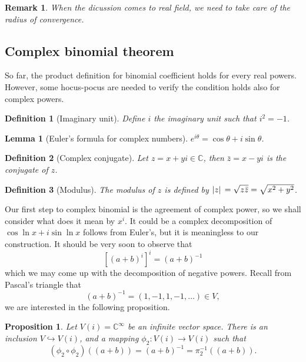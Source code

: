 \documentclass[12pt]{article}
\newtheorem*{definition}{Definition}
\newtheorem*{lemma}{Lemma}
\newtheorem*{proposition}{Proposition}
\newtheorem*{remark}{Remark}
\begin{document}
    \begin{remark}
        When the dicussion comes to real field, we need to take care of the radius of convergence.
    \end{remark}

    \subsection{Complex binomial theorem}

    So far, the product definition for binomial coefficient holds for every real powers. However, some hocus-pocus are needed to verify the condition holds also for complex powers.

    \begin{definition}[Imaginary unit]
        Define $i$ the imaginary unit such that $i^2=-1$.
    \end{definition}

    \begin{lemma}[Euler's formula for complex numbers]
        $e^{i\theta}=\cos{\theta}+i\sin{\theta}$.
    \end{lemma}

    \begin{definition}[Complex conjugate]
        Let $z=x+yi\in\mathbb{C}$, then $\bar{z}=x-yi$ is the conjugate of $z$.
    \end{definition}

    \begin{definition}[Modulus]
        The modulus of $z$ is defined by $\abs*{z}=\sqrt{z\bar{z}}=\sqrt{x^2+y^2}$.
    \end{definition}

    Our first step to complex binomial is the agreement of complex power, so we shall consider what does it mean by $x^i$. It could be a complex decomposition of $\cos{\ln{x}}+i\sin{\ln{x}}$ follows from Euler's, but it is meaningless to our construction. It should be very soon to observe that \[[(a+b)^i]^i=(a+b)^{-1}\] which we may come up with the decomposition of negative powers. Recall from Pascal's triangle that \[(a+b)^{-1}=(1,-1,1,-1,\dots)\in V,\] we are interested in the following proposition.

    \begin{proposition}
        Let $V(i)=\mathbb{C}^{\infty}$ be an infinite vector space. There is an inclusion $V\hookrightarrow V(i)$, and a mapping $\phi_2:V(i)\to V(i)$ such that \[(\phi_2\circ \phi_2)((a+b))=(a+b)^{-1}=\pi_2^{-1}((a+b)).\]
    \end{proposition}
\end{document}
